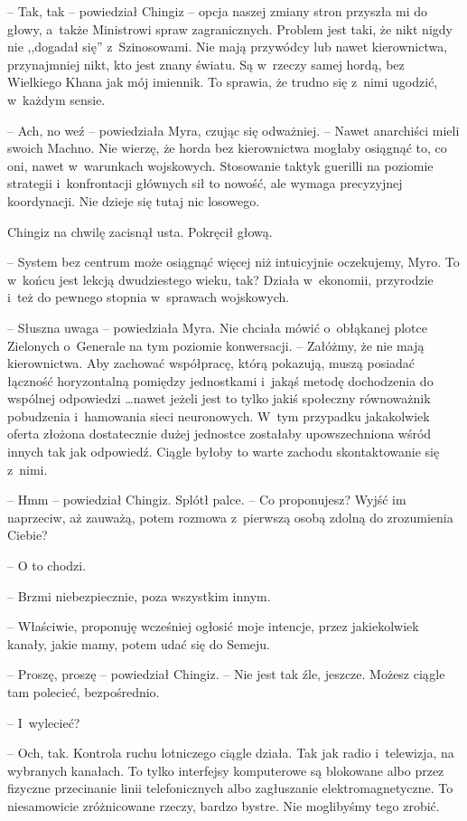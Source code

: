 \documentclass[oneside,polish,11pt,sfheadings]{mwbk}
\begin{document}
-- Tak, tak -- powiedział Chingiz -- opcja naszej zmiany stron przyszła mi
do głowy, a~także Ministrowi spraw zagranicznych. Problem jest taki, że
nikt nigdy nie ,,dogadał się'' z~Szinosowami. Nie mają przywódcy lub
nawet kierownictwa, przynajmniej nikt, kto jest znany światu. Są w~rzeczy samej hordą, bez Wielkiego Khana jak mój imiennik. To sprawia, że
trudno się z~nimi ugodzić, w~każdym sensie.

-- Ach, no weź -- powiedziała Myra, czując się odważniej. -- Nawet
anarchiści mieli swoich Machno. Nie wierzę, że horda bez kierownictwa
mogłaby osiągnąć to, co oni, nawet w~warunkach wojskowych. Stosowanie
taktyk guerilli na poziomie strategii i~konfrontacji głównych sił to
nowość, ale wymaga precyzyjnej koordynacji. Nie dzieje się tutaj nic
losowego.

Chingiz na chwilę zacisnął usta. Pokręcił głową. 

-- System bez centrum
może osiągnąć więcej niż intuicyjnie oczekujemy, Myro. To w~końcu jest
lekcją dwudziestego wieku, tak? Działa w~ekonomii, przyrodzie i~też do
pewnego stopnia w~sprawach wojskowych.

-- Słuszna uwaga -- powiedziała Myra. Nie chciała mówić o~obłąkanej plotce
Zielonych o~Generale na tym poziomie konwersacji. -- Załóżmy, że nie mają
kierownictwa. Aby zachować współpracę, którą pokazują, muszą posiadać
łączność horyzontalną pomiędzy jednostkami i~jakąś metodę dochodzenia do
wspólnej odpowiedzi \ldots nawet jeżeli jest to tylko jakiś społeczny
równoważnik pobudzenia i~hamowania sieci neuronowych. W~tym przypadku
jakakolwiek oferta złożona dostatecznie dużej jednostce zostałaby
upowszechniona wśród innych tak jak odpowiedź. Ciągle byłoby to warte
zachodu skontaktowanie się z~nimi.

-- Hmm -- powiedział Chingiz. Splótł palce. -- Co proponujesz? Wyjść im
naprzeciw, aż zauważą, potem rozmowa z~pierwszą osobą zdolną do
zrozumienia Ciebie?

-- O to chodzi.

-- Brzmi niebezpiecznie, poza wszystkim innym.

-- Właściwie, proponuję wcześniej ogłosić moje intencje, przez
jakiekolwiek kanały, jakie mamy, potem udać się do Semeju.

-- Proszę, proszę -- powiedział Chingiz. -- Nie jest tak źle, jeszcze. Możesz ciągle tam polecieć, bezpośrednio.

-- I~wylecieć?

-- Och, tak. Kontrola ruchu lotniczego ciągle działa. Tak jak radio i~telewizja, na wybranych kanałach. To tylko interfejsy komputerowe są
blokowane albo przez fizyczne przecinanie linii telefonicznych albo
zagłuszanie elektromagnetyczne. To niesamowicie zróżnicowane
rzeczy, bardzo bystre. Nie moglibyśmy tego zrobić.
\end{document}
